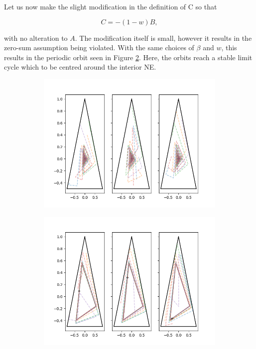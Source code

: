 \documentclass{article}
\theoremstyle{definition}
\begin{document}
  Let us now make the slight modification in the definition of C so that

  \begin{equation}
    C  = - (1 - w) B, 
  \end{equation}

  with no alteration to $A$. The modification itself is small, however it results in the zero-sum assumption being violated. With the same choices of $\beta$ and $w$, this results in the periodic orbit seen in Figure \ref{fig::nonconvergentShapley}. Here, the orbits reach a stable limit cycle which to be centred around the interior NE.

  \begin{figure}[t]
    \centering
    \begin{subfigure}[b]{0.4 \textwidth}
      \includegraphics[width = \textwidth]{Figures/convergentShapley.png}
    \caption{\label{fig::convergentShapley}}
    \end{subfigure}
    \begin{subfigure}[b]{0.4 \textwidth}
      \includegraphics[width = \textwidth]{Figures/nonConvergentShapley.png}
      \caption{\label{fig::nonconvergentShapley}}
    \end{subfigure}
    \caption{\label{fig::Shapley}}
  \end{figure}
\end{document}
